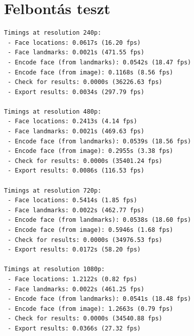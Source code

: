 \section{Felbontás teszt}
\begin{lstlisting}[language=tex, caption=Felbontás teszt eredménye.,label=lst:res_mel]
Timings at resolution 240p:
 - Face locations: 0.0617s (16.20 fps)
 - Face landmarks: 0.0021s (471.55 fps)
 - Encode face (from landmarks): 0.0542s (18.47 fps)
 - Encode face (from image): 0.1168s (8.56 fps)
 - Check for results: 0.0000s (36226.63 fps)
 - Export results: 0.0034s (297.79 fps)

Timings at resolution 480p:
 - Face locations: 0.2413s (4.14 fps)
 - Face landmarks: 0.0021s (469.63 fps)
 - Encode face (from landmarks): 0.0539s (18.56 fps)
 - Encode face (from image): 0.2955s (3.38 fps)
 - Check for results: 0.0000s (35401.24 fps)
 - Export results: 0.0086s (116.53 fps)

Timings at resolution 720p:
 - Face locations: 0.5414s (1.85 fps)
 - Face landmarks: 0.0022s (462.77 fps)
 - Encode face (from landmarks): 0.0538s (18.60 fps)
 - Encode face (from image): 0.5946s (1.68 fps)
 - Check for results: 0.0000s (34976.53 fps)
 - Export results: 0.0172s (58.20 fps)

Timings at resolution 1080p:
 - Face locations: 1.2122s (0.82 fps)
 - Face landmarks: 0.0022s (461.25 fps)
 - Encode face (from landmarks): 0.0541s (18.48 fps)
 - Encode face (from image): 1.2663s (0.79 fps)
 - Check for results: 0.0000s (34540.88 fps)
 - Export results: 0.0366s (27.32 fps)
\end{lstlisting}

